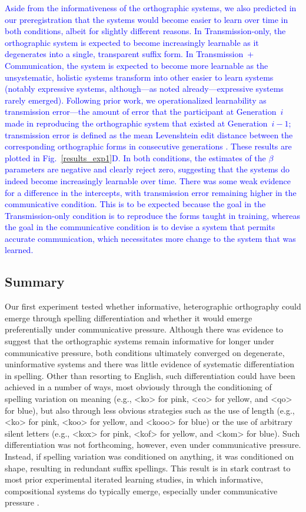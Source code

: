 \documentclass[doc,biblatex]{apa7}
\newcommand\newmaterial[1]{\textcolor{blue}{#1}}
\begin{document}
\newmaterial{Aside from the informativeness of the orthographic systems, we also predicted in our preregistration that the systems would become easier to learn over time in both conditions, albeit for slightly different reasons. In Transmission-only, the orthographic system is expected to become increasingly learnable as it degenerates into a single, transparent suffix form. In Transmission~+ Communication, the system is expected to become more learnable as the unsystematic, holistic systems transform into other easier to learn systems (notably expressive systems, although---as noted already---expressive systems rarely emerged). Following prior work, we operationalized learnability as transmission error---the amount of error that the participant at Generation~$i$ made in reproducing the orthographic system that existed at Generation~$i-1$; transmission error is defined as the mean Levenshtein edit distance between the corresponding orthographic forms in consecutive generations \parencite[see e.g.,][]{Kirby:2008}. These results are plotted in Fig.~\ref{results_exp1}D. In both conditions, the estimates of the $\beta$ parameters are negative and clearly reject zero, suggesting that the systems do indeed become increasingly learnable over time. There was some weak evidence for a difference in the intercepts, with transmission error remaining higher in the communicative condition. This is to be expected because the goal in the Transmission-only condition is to reproduce the forms taught in training, whereas the goal in the communicative condition is to devise a system that permits accurate communication, which necessitates more change to the system that was learned.}

\subsection{Summary}

Our first experiment tested whether informative, heterographic orthography could emerge through spelling differentiation and whether it would emerge preferentially under communicative pressure. Although there was evidence to suggest that the orthographic systems remain informative for longer under communicative pressure, both conditions ultimately converged on degenerate, uninformative systems and there was little evidence of systematic differentiation in spelling. Other than resorting to English, such differentiation could have been achieved in a number of ways, most obviously through the conditioning of spelling variation on meaning (e.g., <ko> for pink, <co> for yellow, and <qo> for blue), but also through less obvious strategies such as the use of length (e.g., <ko> for pink, <koo> for yellow, and <kooo> for blue) or the use of arbitrary silent letters (e.g., <kox> for pink, <kof> for yellow, and <kom> for blue). Such differentiation was not forthcoming, however, even under communicative pressure. Instead, if spelling variation was conditioned on anything, it was conditioned on shape, resulting in redundant suffix spellings. This result is in stark contrast to most prior experimental iterated learning studies, in which informative, compositional systems do typically emerge, especially under communicative pressure \parencite[e.g.,][]{Kirby:2015}.
\end{document}
